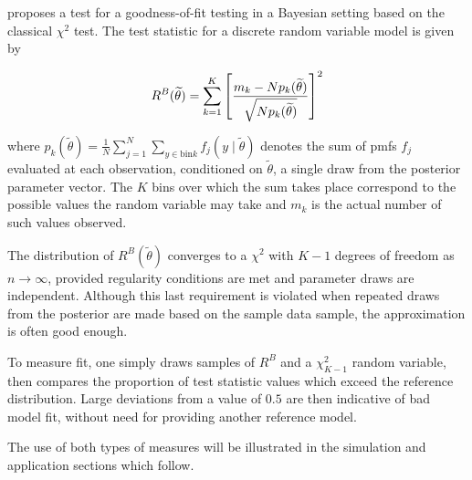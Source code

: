 \cite{johnson2004bayesian} proposes a test for a goodness-of-fit testing in a Bayesian setting based on the classical $\chi^2$ test. The test statistic for a discrete random variable model is given by

\begin{equation}
R^B(\widetilde{\theta}) = \sum_{k=1}^K \left[{m_k - Np_k(\widetilde{\theta}) \over \sqrt{Np_k(\widetilde{\theta})}}\right]^2
\end{equation}

where $p_k(\widetilde{\theta}) = \frac{1}{N} \sum_{j=1}^N\sum_{y\in \text{bin}k}f_j(y \mid \widetilde{\theta})$ denotes the sum of pmfs $f_j$ evaluated at each observation, conditioned on $\widetilde{\theta}$, a single draw from the posterior parameter vector. The $K$ bins over which the sum takes place correspond to the possible values the random variable may take and $m_k$ is the actual number of such values observed.

The distribution of $R^B(\widetilde{\theta})$ converges to a $\chi^2$ with $K-1$ degrees of freedom as $n \rightarrow \infty$, provided regularity conditions are met and parameter draws are independent. Although this last requirement is violated when repeated draws from the posterior are made based on the sample data sample, the approximation is often good enough. 

To measure fit, one simply draws samples of $R^B$ and a  $\chi^2_{K-1}$ random variable, then compares the proportion of test statistic values which exceed the reference distribution. Large deviations from a value of $0.5$ are then indicative of bad model fit, without need for providing another reference model.

The use of both types of measures will be illustrated in the simulation and application sections which follow.